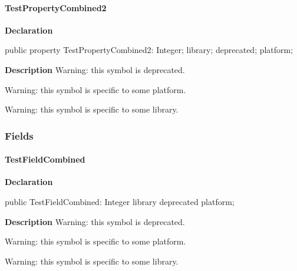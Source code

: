 \documentclass{report}
\begin{document}
\paragraph*{TestPropertyCombined2}\hspace*{\fill}

\begin{list}{}{
\setlength{\itemindent}{0cm}
\setlength{\listparindent}{0cm}
\setlength{\leftmargin}{\evensidemargin}
\addtolength{\leftmargin}{\tmplength}
\settowidth{\labelsep}{X}
\addtolength{\leftmargin}{\labelsep}
\setlength{\labelwidth}{\tmplength}
}
\begin{flushleft}
\item[\textbf{Declaration}\hfill]
\begin{ttfamily}
public property TestPropertyCombined2: Integer; library; deprecated; platform;\end{ttfamily}


\end{flushleft}
\par
\item[\textbf{Description}]
Warning: this symbol is deprecated.

Warning: this symbol is specific to some platform.

Warning: this symbol is specific to some library.

 

\end{list}
\subsubsection*{\large{\textbf{Fields}}\normalsize\hspace{1ex}\hfill}
\paragraph*{TestFieldCombined}\hspace*{\fill}

\begin{list}{}{
\setlength{\itemindent}{0cm}
\setlength{\listparindent}{0cm}
\setlength{\leftmargin}{\evensidemargin}
\addtolength{\leftmargin}{\tmplength}
\settowidth{\labelsep}{X}
\addtolength{\leftmargin}{\labelsep}
\setlength{\labelwidth}{\tmplength}
}
\begin{flushleft}
\item[\textbf{Declaration}\hfill]
\begin{ttfamily}
public TestFieldCombined: Integer library deprecated platform;\end{ttfamily}


\end{flushleft}
\par
\item[\textbf{Description}]
Warning: this symbol is deprecated.

Warning: this symbol is specific to some platform.

Warning: this symbol is specific to some library.

 

\end{list}
\end{document}
